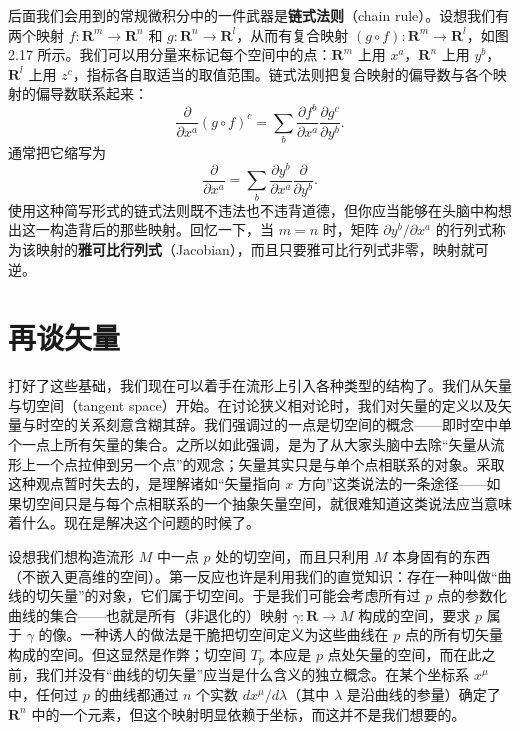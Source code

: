 后面我们会用到的常规微积分中的一件武器是\textbf{链式法则}（chain rule）。设想我们有两个映射 $f:\mathbf{R}^m\to\mathbf{R}^n$ 和 $g:\mathbf{R}^n\to\mathbf{R}^l$，从而有复合映射 $(g\circ f):\mathbf{R}^m\to\mathbf{R}^l$，如图 2.17 所示。我们可以用分量来标记每个空间中的点：$\mathbf{R}^m$ 上用 $x^a$，$\mathbf{R}^n$ 上用 $y^b$，$\mathbf{R}^l$ 上用 $z^c$，指标各自取适当的取值范围。链式法则把复合映射的偏导数与各个映射的偏导数联系起来：
\begin{equation*}
\frac{\partial}{\partial x^a}(g\circ f)^c=\sum_b \frac{\partial f^b}{\partial x^a}\frac{\partial g^c}{\partial y^b}. \tag{2.12}
\end{equation*}
通常把它缩写为
\begin{equation*}
\frac{\partial}{\partial x^a}=\sum_b \frac{\partial y^b}{\partial x^a}\frac{\partial}{\partial y^b}. \tag{2.13}
\end{equation*}
使用这种简写形式的链式法则既不违法也不违背道德，但你应当能够在头脑中构想出这一构造背后的那些映射。回忆一下，当 $m=n$ 时，矩阵 $\partial y^b/\partial x^a$ 的行列式称为该映射的\textbf{雅可比行列式}（Jacobian），而且只要雅可比行列式非零，映射就可逆。

\section{再谈矢量}

打好了这些基础，我们现在可以着手在流形上引入各种类型的结构了。我们从矢量与切空间（tangent space）开始。在讨论狭义相对论时，我们对矢量的定义以及矢量与时空的关系刻意含糊其辞。我们强调过的一点是切空间的概念——即时空中单个一点上所有矢量的集合。之所以如此强调，是为了从大家头脑中去除“矢量从流形上一个点拉伸到另一个点”的观念；矢量其实只是与单个点相联系的对象。采取这种观点暂时失去的，是理解诸如“矢量指向 $x$ 方向”这类说法的一条途径——如果切空间只是与每个点相联系的一个抽象矢量空间，就很难知道这类说法应当意味着什么。现在是解决这个问题的时候了。

设想我们想构造流形 $M$ 中一点 $p$ 处的切空间，而且只利用 $M$ 本身固有的东西（不嵌入更高维的空间）。第一反应也许是利用我们的直觉知识：存在一种叫做“曲线的切矢量”的对象，它们属于切空间。于是我们可能会考虑所有过 $p$ 点的参数化曲线的集合——也就是所有（非退化的）映射 $\gamma:\mathbf{R}\to M$ 构成的空间，要求 $p$ 属于 $\gamma$ 的像。一种诱人的做法是干脆把切空间定义为这些曲线在 $p$ 点的所有切矢量构成的空间。但这显然是作弊；切空间 $T_p$ 本应是 $p$ 点处矢量的空间，而在此之前，我们并没有“曲线的切矢量”应当是什么含义的独立概念。在某个坐标系 $x^\mu$ 中，任何过 $p$ 的曲线都通过 $n$ 个实数 $dx^\mu/d\lambda$（其中 $\lambda$ 是沿曲线的参量）确定了 $\mathbf{R}^n$ 中的一个元素，但这个映射明显依赖于坐标，而这并不是我们想要的。

